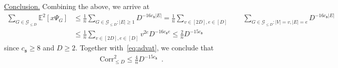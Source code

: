 \documentclass[final]{colt2026}
\newcommand{\1}{\mathbf{1}}
\begin{document}
\noindent
\underline{Conclusion.} Combining the above, we arrive at 
\begin{align*}
 \sum_{G\in \mathcal{G}_{\leq D}} \mathbb{E}^2[x\Psi_G]  &\leq  \frac{1}{n}\sum_{G\in \mathcal G_{\leq D}: |E| \geq 1}  D^{-16c_{\texttt{s}}|E|}= \frac{1}{n}\sum_{v\in [2D],e \in [D]}\quad \quad  \sum_{G\in \mathcal G_{\leq D}: |V|=v, |E|=e} D^{-16c_{\texttt{s}}|E|}\\
    &\leq   \frac{1}{n}\sum_{v\in [2D],e \in [D]} v^{2e}  D^{-16c_{\texttt{s}}e}\leq  \frac{2}{n} D^{-15 c_{\texttt{s}}}\enspace 
\end{align*}
since $c_{\texttt{s}}\geq 8$ and $D \geq 2$.
Together with~\eqref{eq:advat}, we conclude that 
\begin{align*}
 \mathrm{Corr}^2_{\leq D}\leq  \frac{4}{n} D^{-15 c_{\texttt{s}}}\enspace . 
\end{align*}
\end{document}
